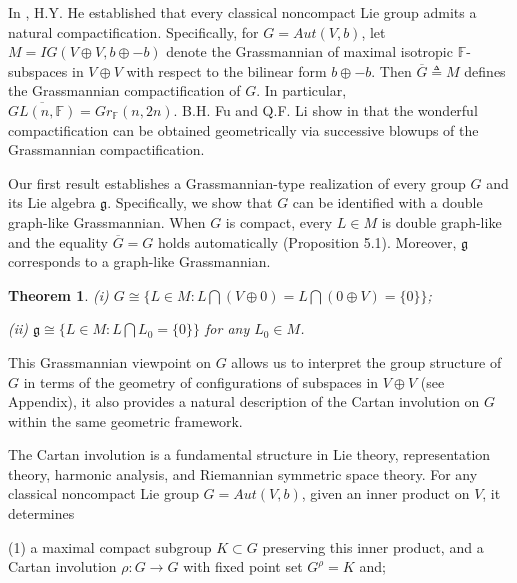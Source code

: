 \documentclass{article}
\newtheorem{thm}{Theorem}[section]
\begin{document}
In \cite{He}, H.Y. He established that every classical noncompact Lie group admits a natural compactification. Specifically, for $G=Aut(V,b)$, let $M=IG(V \oplus V, b\oplus-b)$ denote the Grassmannian of maximal isotropic $\mathbb{F}$-subspaces in $V\oplus V$ with respect to the bilinear form $b\oplus-b$.  Then $\overline{G} \triangleq M$ defines the Grassmannian compactification of $G$. In particular, $\overline{GL(n, \mathbb{F})}=Gr_{\mathbb{F}}(n,2n)$. B.H. Fu and Q.F. Li show in \cite{FL} that the wonderful compactification can be obtained geometrically via successive blowups of the Grassmannian compactification.

Our first result establishes a Grassmannian-type realization of every group $G$ and its Lie algebra $\mathfrak{g}$.  Specifically, we show that
$G$ can be identified with a double graph-like Grassmannian. When $G$ is compact, every $L \in M$ is double graph-like and the equality $\overline{G}=G$ holds automatically (Proposition 5.1).
Moreover, $\mathfrak{g}$ corresponds to a graph-like Grassmannian.

\begin{thm}
(i) $G \cong \{L \in M: L \bigcap (V\oplus 0)=L \bigcap (0\oplus V)=\{0\}\}$;

(ii) $\mathfrak{g} \cong \{L \in M: L \bigcap L_0=\{0\}\}$ for any $L_0 \in M$.
\end{thm}
This Grassmannian viewpoint on $G$  allows us to interpret the group structure of $G$ in terms of the geometry of configurations of subspaces in $V\oplus V$ (see Appendix),
it also provides a natural description of the Cartan involution on  $G$ within the same geometric framework.

\bigskip

The Cartan involution is a fundamental structure in Lie theory, representation theory, harmonic analysis, and Riemannian symmetric space theory.
For any classical noncompact Lie group $G=Aut(V,b)$, given an inner product on $V$, it determines

(1) a maximal compact subgroup $K \subset G$ preserving this inner product, and a Cartan involution  $\rho: G \rightarrow G$ with fixed point set $G^{\rho}=K$ and;
\end{document}
